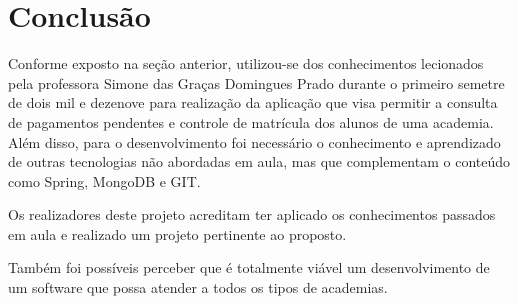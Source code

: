 \chapter{Conclusão}\label{cap_conclu}

Conforme exposto na seção anterior, utilizou-se dos conhecimentos lecionados pela professora Simone das Graças Domingues Prado durante o primeiro semetre de dois mil e dezenove para realização da aplicação que visa permitir a consulta de pagamentos pendentes e controle de matrícula dos alunos de uma academia. Além disso, para o desenvolvimento foi necessário o conhecimento e aprendizado de outras tecnologias não abordadas em aula, mas que complementam o conteúdo como Spring, MongoDB e GIT.

Os realizadores deste projeto acreditam ter aplicado os conhecimentos passados em aula e realizado um projeto pertinente ao proposto.

Também foi possíveis perceber que é totalmente viável um desenvolvimento de um software que possa atender a todos os tipos de academias.